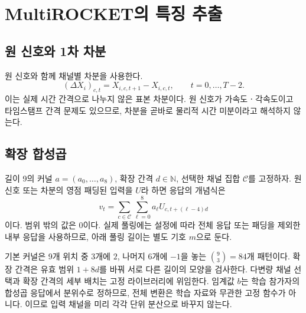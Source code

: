 \documentclass[11pt,a4paper]{article}
\newcommand{\code}[1]{\texttt{\detokenize{#1}}}
\numberwithin{equation}{section}
\begin{document}
\section{MultiROCKET의 특징 추출}
\subsection{원 신호와 1차 차분}
원 신호와 함께 채널별 차분을 사용한다.
\begin{equation}
 (\Delta X_i)_{c,t}=X_{i,c,t+1}-X_{i,c,t},\qquad t=0,\ldots,T-2.
\end{equation}
이는 실제 시간 간격으로 나누지 않은 표본 차분이다.
원 신호가 가속도ㆍ각속도이고 타임스탬프 간격 문제도 있으므로,
차분을 곧바로 물리적 시간 미분이라고 해석하지 않는다.

\subsection{확장 합성곱}
길이 9의 커널 \(a=(a_0,\ldots,a_8)\), 확장 간격 \(d\in\mathbb N\),
선택한 채널 집합 \(\mathcal C\)를 고정하자.
원 신호 또는 차분의 영점 패딩된 입력을 \(U\)라 하면 응답의 개념식은
\begin{equation}
 v_t=\sum_{c\in\mathcal C}\sum_{\ell=0}^{8}
 a_\ell U_{c,t+(\ell-4)d}
\end{equation}
이다. 범위 밖의 값은 \(0\)이다.
실제 풀링에는 설정에 따라 전체 응답 또는 패딩을 제외한 내부 응답을 사용하므로,
아래 풀링 길이는 별도 기호 \(m\)으로 둔다.

기본 커널은 9개 위치 중 3개에 \(2\), 나머지 6개에 \(-1\)을 놓는
\(\binom93=84\)개 패턴이다.
확장 간격은 유효 범위 \(1+8d\)를 바꿔 서로 다른 길이의 모양을 검사한다.
다변량 채널 선택과 확장 간격의 세부 배치는 고정 라이브러리에 위임한다.
임계값 \(b\)는 학습 참가자의 합성곱 응답에서 분위수로 정하므로,
전체 변환은 학습 자료와 무관한 고정 함수가 아니다.
\code{normalise=False}이므로 입력 채널을 미리 각각 단위 분산으로 바꾸지 않는다.
\end{document}
